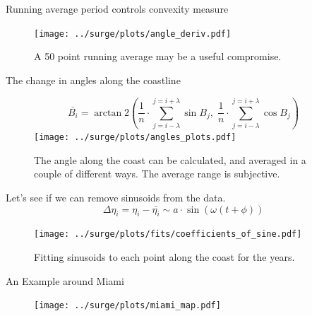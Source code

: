 \begin{frame}{Running average period controls convexity measure }
\vspace{-20pt}
\begin{figure}[htb!]
    \centering
    \texttt{[image: ../surge/plots/angle\_deriv.pdf]}
    \caption{A 50 point running average may be a useful compromise. }
\end{figure}
\end{frame}


\begin{frame}{The change in angles along the coastline}
\vspace{-20pt}
\begin{figure}[htb!]
    \centering
    \begin{equation}
\bar{B_i}=\operatorname{arctan} 2\left(\frac{1}{n} \cdot
\sum_{j=i-\lambda}^{j=i+\lambda}  \sin B_{j},\; \frac{1}{n}
 \cdot \sum_{j=i-\lambda}^{j=i+\lambda} \cos B_{j}\right)
\end{equation}
    \texttt{[image: ../surge/plots/angles\_plots.pdf]}
    \caption{The angle along the coast can be calculated, and averaged in a couple
     of different ways. The average range is subjective.}
\end{figure}
\end{frame}

\begin{frame}{Let's see if we can remove sinusoids from the data. }
\begin{equation}
\Delta\eta_i = \eta_i - \bar{\eta_i} \sim a\cdot \sin{(\omega(t + \phi))}
\end{equation}
\vspace{-20pt}
\begin{figure}[htb!]
    \centering
    \hspace{-10pt}
    \texttt{[image: ../surge/plots/fits/coefficients\_of\_sine.pdf]}
    \vspace{-7pt}
   \caption{Fitting sinusoids to each point along the coast for the years.}
    \label{fig:}
\end{figure}
\end{frame}



\begin{frame}{An Example around Miami}
\vspace{-30pt}
\begin{figure}[htb!]
    \centering
    \texttt{[image: ../surge/plots/miami\_map.pdf]}
\end{figure}
\end{frame}


